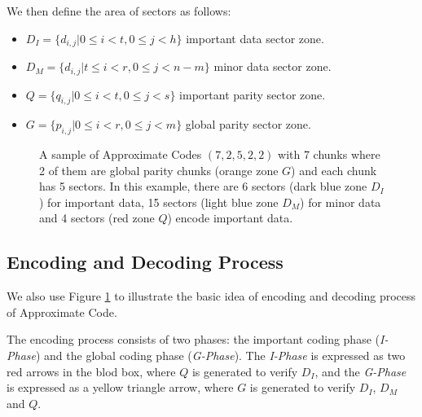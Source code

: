 \documentclass[sigconf]{acmart}
\begin{document}
We then define the area of sectors as follows:
\begin{itemize}
    \item $D_I=\{d_{i,j}|0\leqslant i < t, 0\leqslant j < h \}$ important data sector zone.
    \item $D_M=\{d_{i,j}|t\leqslant i < r, 0\leqslant j < n-m \}$ minor data sector zone.
    \item $Q=\{q_{i,j}|0\leqslant i < t, 0\leqslant j < s \}$ important parity sector zone. 
    \item $G=\{p_{i,j}|0\leqslant i < r, 0\leqslant j < m \}$ global parity sector zone.
\end{itemize}

\begin{figure}[h]
\centering
{}
\caption{A sample of Approximate Codes $(7,2,5,2,2)$ with 7 chunks where 2 of them are global parity chunks (orange zone $G$) and each chunk has 5 sectors. In this example, there are 6 sectors (dark blue zone $D_I$) for important data, 15 sectors (light blue zone $D_M$) for minor data and 4 sectors (red zone $Q$) encode important data.}
\label{apcode-72522}
\end{figure}

\subsection{Encoding and Decoding Process}
We also use Figure \ref{apcode-72522} to illustrate the basic idea of encoding and decoding process of Approximate Code.

The encoding process consists of two phases: the important coding phase (\emph{I-Phase}) and the global coding phase (\emph{G-Phase}). 
The \emph{I-Phase} is expressed as two red arrows in the blod box, where $Q$ is generated to verify $D_I$, and the \emph{G-Phase} is expressed as a yellow triangle arrow, where $G$ is generated to verify $D_I$, $D_M$ and $Q$.
\end{document}
